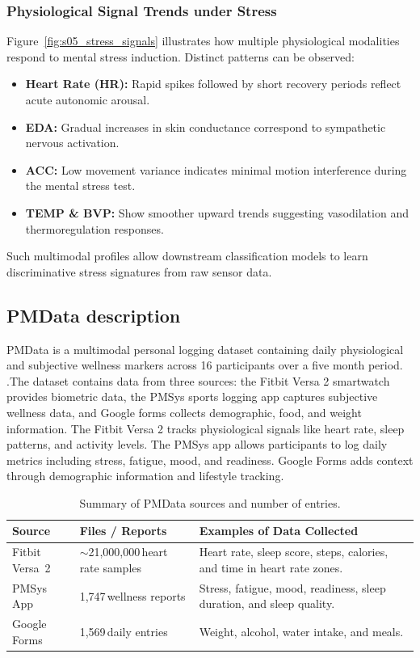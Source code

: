 \documentclass[12pt,letterpaper]{article}
\begin{document}
\subsubsection{Physiological Signal Trends under Stress}
Figure~\ref{fig:s05_stress_signals} illustrates how multiple physiological modalities respond to mental stress induction.
Distinct patterns can be observed:
\begin{itemize}
    \item \textbf{Heart Rate (HR):} Rapid spikes followed by short recovery periods reflect acute autonomic arousal.
    \item \textbf{EDA:} Gradual increases in skin conductance correspond to sympathetic nervous activation.
    \item \textbf{ACC:} Low movement variance indicates minimal motion interference during the mental stress test.
    \item \textbf{TEMP \& BVP:} Show smoother upward trends suggesting vasodilation and thermoregulation responses.
\end{itemize}
Such multimodal profiles allow downstream classification models to learn discriminative stress signatures from raw sensor data.






\subsection{PMData description}
PMData is a multimodal personal logging dataset containing daily physiological and subjective wellness markers across 16 participants over a five month period. \citep{thambawita2020pmdata}.The dataset contains data from three sources: the Fitbit Versa 2 smartwatch provides biometric data, the PMSys sports logging app captures subjective wellness data, and Google forms collects demographic, food, and weight information. The Fitbit Versa 2 tracks physiological signals like heart rate, sleep patterns, and activity levels. The PMSys app allows participants to log daily metrics including stress, fatigue, mood, and readiness. Google Forms adds context through demographic information and lifestyle tracking. 

\begin{table}[H]
\centering
\renewcommand{\arraystretch}{1.2} 
\setlength{\tabcolsep}{6pt} 
\caption{Summary of PMData sources and number of entries.}
\label{tab:pmdata-summary}
\begin{tabular}{p{3.5cm}p{4cm}p{6.5cm}}
\toprule
\textbf{Source} & \textbf{Files / Reports} & \textbf{Examples of Data Collected} \\
\midrule
Fitbit Versa~2 & $\sim$21{,}000{,}000\,heart rate samples & Heart rate, sleep score, steps, calories, and time in heart rate zones. \\
PMSys App & 1{,}747\,wellness reports & Stress, fatigue, mood, readiness, sleep duration, and sleep quality. \\
Google Forms & 1{,}569\,daily entries & Weight, alcohol, water intake, and meals. \\
\bottomrule
\end{tabular}
\end{table}
\end{document}
